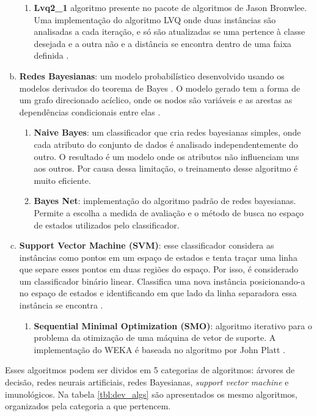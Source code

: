 \begin{enumerate}[a)]
        \begin{enumerate}[1.]
            \item \textbf{Lvq2\_1} algoritmo presente no pacote de algoritmos de Jason Bronwlee. Uma implementação do algoritmo LVQ onde duas instâncias são analisadas a cada iteração, e só são atualizadas se uma pertence à classe desejada e a outra não e a distância se encontra dentro de uma faixa definida \cite{Brownlee2011w}.
        \end{enumerate}
    \item \textbf{Redes Bayesianas}: um modelo probabilístico desenvolvido usando os modelos derivados do teorema de Bayes \cite{Bayes1763}. O modelo gerado tem a forma de um grafo direcionado acíclico, onde os nodos são variáveis e as arestas as dependências condicionais entre elas \cite{Pearl1988}.
        \begin{enumerate}[1.]
            \item \textbf{Naive Bayes}: um classificador que cria redes bayesianas simples, onde cada atributo do conjunto de dados é analisado independentemente do outro. O resultado é um modelo onde os atributos não influenciam uns aos outros. Por causa dessa limitação, o treinamento desse algoritmo é muito eficiente.
            \item \textbf{Bayes Net}: implementação do algoritmo padrão de redes bayesianas. Permite a escolha a medida de avaliação e o método de busca no espaço de estados utilizados pelo classificador.
        \end{enumerate}
    \item \textbf{Support Vector Machine (SVM)}: esse classificador considera as instâncias como pontos em um espaço de estados e tenta traçar uma linha que separe esses pontos em duas regiões do espaço. Por isso, é considerado um classificador binário linear. Classifica uma nova instância posicionando-a no espaço de estados e identificando em que lado da linha separadora essa instância se encontra \cite{Cortes1995}.
        \begin{enumerate}[1.]
            \item \textbf{Sequential Minimal Optimization (SMO)}: algoritmo iterativo para o problema da otimização de uma máquina de vetor de suporte. A implementação do WEKA é baseada no algoritmo por John Platt \cite{Platt1998}.
        \end{enumerate}
\end{enumerate}

Esses algoritmos podem ser dividos em 5 categorias de algoritmos: árvores de decisão, redes neurais artificiais, redes Bayesianas, \emph{support vector machine} e imunológicos. Na tabela \ref{tbl:dev_algs} são apresentados os mesmo algoritmos, organizados pela categoria a que pertencem.

